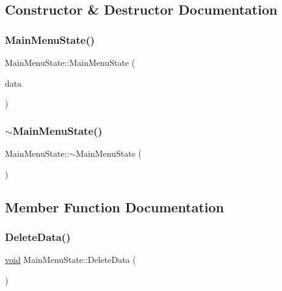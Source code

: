 \subsection{Constructor \& Destructor Documentation}
\mbox{\label{classMainMenuState_a79e2679fda51c82d1a793cfc15ca9488}} 
\subsubsection{\texorpdfstring{Main\+Menu\+State()}{MainMenuState()}}
{\footnotesize\ttfamily Main\+Menu\+State\+::\+Main\+Menu\+State (\begin{DoxyParamCaption}\item[{\hyperlink{structGameData}{Game\+Data} \&}]{data }\end{DoxyParamCaption})}

\mbox{\label{classMainMenuState_a8af4d586b93c315a1a15b5fe83ec0760}} 
\subsubsection{\texorpdfstring{$\sim$\+Main\+Menu\+State()}{~MainMenuState()}}
{\footnotesize\ttfamily Main\+Menu\+State\+::$\sim$\+Main\+Menu\+State (\begin{DoxyParamCaption}{ }\end{DoxyParamCaption})}



\subsection{Member Function Documentation}
\mbox{\label{classMainMenuState_a52c4dad229a1e9851e8742b81bc30abb}} 
\subsubsection{\texorpdfstring{Delete\+Data()}{DeleteData()}}
{\footnotesize\ttfamily \hyperlink{imgui__impl__opengl3__loader_8h_ac668e7cffd9e2e9cfee428b9b2f34fa7}{void} Main\+Menu\+State\+::\+Delete\+Data (\begin{DoxyParamCaption}{ }\end{DoxyParamCaption})\hspace{0.3cm}{\ttfamily [virtual]}}



